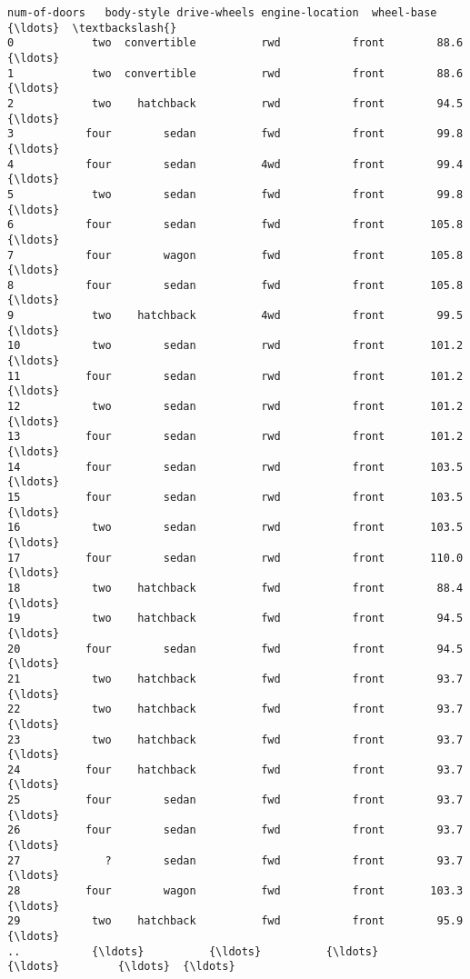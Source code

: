 \documentclass[11pt]{article}
\begin{document}
\begin{tcolorbox}[breakable, boxrule=.5pt, size=fbox, pad at break*=1mm, opacityfill=0]
\begin{Verbatim}[commandchars=\\\{\}]
    num-of-doors   body-style drive-wheels engine-location  wheel-base  {\ldots}  \textbackslash{}
0            two  convertible          rwd           front        88.6  {\ldots}
1            two  convertible          rwd           front        88.6  {\ldots}
2            two    hatchback          rwd           front        94.5  {\ldots}
3           four        sedan          fwd           front        99.8  {\ldots}
4           four        sedan          4wd           front        99.4  {\ldots}
5            two        sedan          fwd           front        99.8  {\ldots}
6           four        sedan          fwd           front       105.8  {\ldots}
7           four        wagon          fwd           front       105.8  {\ldots}
8           four        sedan          fwd           front       105.8  {\ldots}
9            two    hatchback          4wd           front        99.5  {\ldots}
10           two        sedan          rwd           front       101.2  {\ldots}
11          four        sedan          rwd           front       101.2  {\ldots}
12           two        sedan          rwd           front       101.2  {\ldots}
13          four        sedan          rwd           front       101.2  {\ldots}
14          four        sedan          rwd           front       103.5  {\ldots}
15          four        sedan          rwd           front       103.5  {\ldots}
16           two        sedan          rwd           front       103.5  {\ldots}
17          four        sedan          rwd           front       110.0  {\ldots}
18           two    hatchback          fwd           front        88.4  {\ldots}
19           two    hatchback          fwd           front        94.5  {\ldots}
20          four        sedan          fwd           front        94.5  {\ldots}
21           two    hatchback          fwd           front        93.7  {\ldots}
22           two    hatchback          fwd           front        93.7  {\ldots}
23           two    hatchback          fwd           front        93.7  {\ldots}
24          four    hatchback          fwd           front        93.7  {\ldots}
25          four        sedan          fwd           front        93.7  {\ldots}
26          four        sedan          fwd           front        93.7  {\ldots}
27             ?        sedan          fwd           front        93.7  {\ldots}
28          four        wagon          fwd           front       103.3  {\ldots}
29           two    hatchback          fwd           front        95.9  {\ldots}
..           {\ldots}          {\ldots}          {\ldots}             {\ldots}         {\ldots}  {\ldots}

\end{Verbatim}
\end{tcolorbox}
\end{document}
